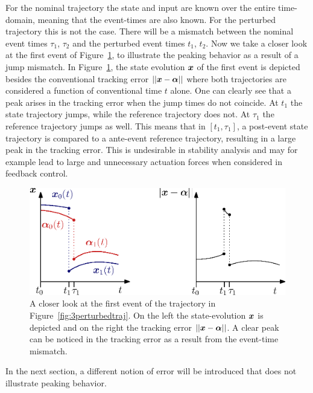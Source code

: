 \documentclass[../DC2017114Bouma.tex]{subfiles}
\begin{document}
For the nominal trajectory the state and input are known over the entire time-domain, meaning that the event-times are also known. For the perturbed trajectory this is not the case. There will be a mismatch between the nominal event times $\tau_1$, $\tau_2$ and the perturbed event times $t_1$, $t_2$. Now we take a closer look at the first event of Figure~\ref{fig:3peakerror}, to illustrate the peaking behavior as a result of a jump mismatch. In Figure~\ref{fig:3peakerror}, the state evolution ${\boldsymbol{x}}$ of the first event is depicted besides the conventional tracking error $||{\boldsymbol{x}}-\boldsymbol{\alpha}||$ where both trajectories are considered a function of conventional time $t$ alone. One can clearly see that a peak arises in the tracking error when the jump times do not coincide. At $t_1$ the state trajectory jumps, while the reference trajectory does not. At $\tau_1$ the reference trajectory jumps as well. This means that in $[t_1,\tau_1]$, a post-event state trajectory is compared to a ante-event reference trajectory, resulting in a large peak in the tracking error. This is undesirable in stability analysis and may for example lead to large and unnecessary actuation forces when considered in feedback control.

\begin{figure}[h]
\centering
\includegraphics[width=.66\textwidth]{peakerror.eps}\caption{A closer look at the first event of the trajectory in Figure~\ref{fig:3perturbedtraj}. On the left the state-evolution ${\boldsymbol{x}}$ is depicted and on the right the tracking error $||{\boldsymbol{x}}-\boldsymbol{\alpha}||$. A clear peak can be noticed in the tracking error as a result from the event-time mismatch.} \label{fig:3peakerror}
\end{figure}

In the next section, a different notion of error will be introduced that does not illustrate peaking behavior.
%
%
%
%
%
\end{document}
